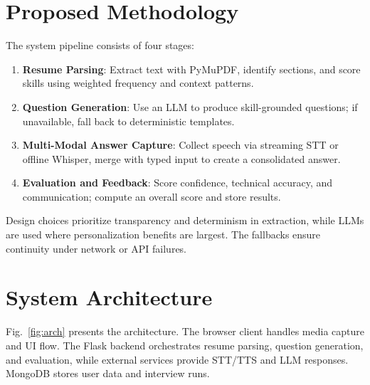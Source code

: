 \documentclass[conference]{IEEEtran}
\begin{document}
\section{Proposed Methodology}
The system pipeline consists of four stages:
\begin{enumerate}
\item \textbf{Resume Parsing}: Extract text with PyMuPDF, identify sections, and score skills using weighted frequency and context patterns.
\item \textbf{Question Generation}: Use an LLM to produce skill-grounded questions; if unavailable, fall back to deterministic templates.
\item \textbf{Multi-Modal Answer Capture}: Collect speech via streaming STT or offline Whisper, merge with typed input to create a consolidated answer.
\item \textbf{Evaluation and Feedback}: Score confidence, technical accuracy, and communication; compute an overall score and store results.
\end{enumerate}
Design choices prioritize transparency and determinism in extraction, while LLMs are used where personalization benefits are largest. The fallbacks ensure continuity under network or API failures.

\section{System Architecture}
Fig.~\ref{fig:arch} presents the architecture. The browser client handles media capture and UI flow. The Flask backend orchestrates resume parsing, question generation, and evaluation, while external services provide STT/TTS and LLM responses. MongoDB stores user data and interview runs.
\end{document}
